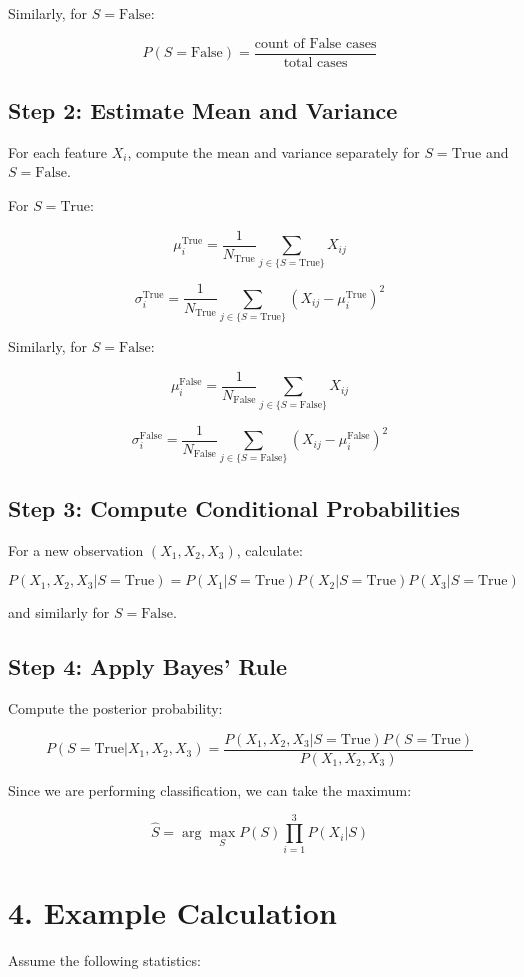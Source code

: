 \documentclass{article}
\begin{document}
Similarly, for \( S = \text{False} \):

\[
P(S = \text{False}) = \frac{\text{count of False cases}}{\text{total cases}}
\]

\subsection{Step 2: Estimate Mean and Variance}
For each feature \( X_i \), compute the mean and variance separately for \( S = \text{True} \) and \( S = \text{False} \).

For \( S = \text{True} \):

\[
\mu_i^{\text{True}} = \frac{1}{N_{\text{True}}} \sum_{j \in \{S = \text{True}\}} X_{ij}
\]

\[
\sigma_i^{\text{True}} = \frac{1}{N_{\text{True}}} \sum_{j \in \{S = \text{True}\}} (X_{ij} - \mu_i^{\text{True}})^2
\]

Similarly, for \( S = \text{False} \):

\[
\mu_i^{\text{False}} = \frac{1}{N_{\text{False}}} \sum_{j \in \{S = \text{False}\}} X_{ij}
\]

\[
\sigma_i^{\text{False}} = \frac{1}{N_{\text{False}}} \sum_{j \in \{S = \text{False}\}} (X_{ij} - \mu_i^{\text{False}})^2
\]

\subsection{Step 3: Compute Conditional Probabilities}
For a new observation \( (X_1, X_2, X_3) \), calculate:

\[
P(X_1, X_2, X_3 | S = \text{True}) = P(X_1 | S = \text{True}) P(X_2 | S = \text{True}) P(X_3 | S = \text{True})
\]

and similarly for \( S = \text{False} \).

\subsection{Step 4: Apply Bayes' Rule}
Compute the posterior probability:

\[
P(S = \text{True} | X_1, X_2, X_3) = \frac{P(X_1, X_2, X_3 | S = \text{True}) P(S = \text{True})}{P(X_1, X_2, X_3)}
\]

Since we are performing classification, we can take the maximum:

\[
\hat{S} = \arg\max_{S} P(S) \prod_{i=1}^{3} P(X_i | S)
\]

\section{4. Example Calculation}
Assume the following statistics:
\end{document}
